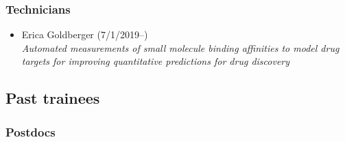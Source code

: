 \documentclass[10pt]{article}
\begin{document}
\subsubsection*{Technicians}

\begin{itemize}
  \item Erica Goldberger (7/1/2019--)\\
  \emph{Automated measurements of small molecule binding affinities to model drug targets for improving quantitative predictions for drug discovery}

\end{itemize}

\eject

\subsection*{Past trainees}

\subsubsection*{Postdocs}
\end{document}
